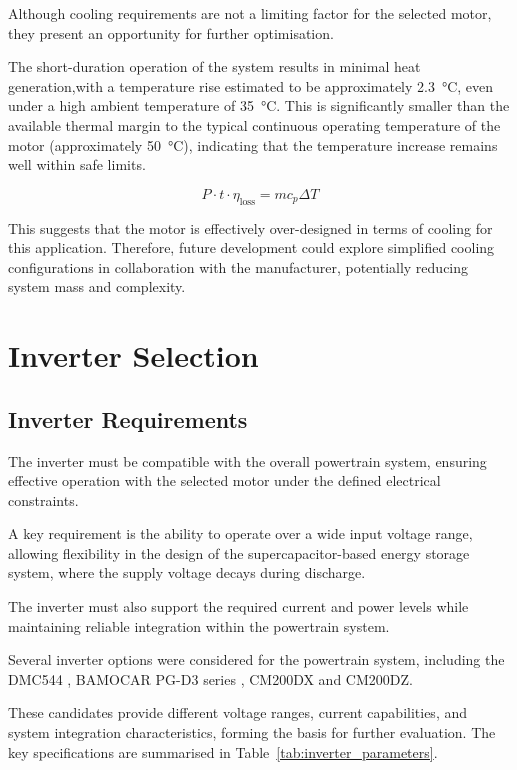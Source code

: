 Although cooling requirements are not a limiting factor for the selected motor, they present an opportunity for further optimisation.

The short-duration operation of the system results in minimal heat generation,with a temperature rise estimated to be approximately \SI{2.3}{\degreeCelsius}, even under a high ambient temperature of \SI{35}{\degreeCelsius}. This is significantly smaller than the available thermal margin to the typical continuous operating temperature of the motor (approximately \SI{50}{\degreeCelsius}), indicating that the temperature increase remains well within safe limits.

\begin{equation}
P \cdot t \cdot \eta_{\text{loss}} = m c_p \Delta T
\end{equation}

This suggests that the motor is effectively over-designed in terms of cooling for this application. Therefore, future development could explore simplified cooling configurations in collaboration with the manufacturer, potentially reducing system mass and complexity.


\section{Inverter Selection}

\subsection{Inverter Requirements}

The inverter must be compatible with the overall powertrain system, ensuring effective operation with the selected motor under the defined electrical constraints.

A key requirement is the ability to operate over a wide input voltage range, allowing flexibility in the design of the supercapacitor-based energy storage system, where the supply voltage decays during discharge.

The inverter must also support the required current and power levels while maintaining reliable integration within the powertrain system.

Several inverter options were considered for the powertrain system, including the DMC544\cite{DMC544_datasheet}
, BAMOCAR PG-D3 series\cite{BAMOCAR_data_sheet}
, CM200DX and CM200DZ\cite{CM200_data_sheet}.

These candidates provide different voltage ranges, current capabilities, and system integration characteristics, forming the basis for further evaluation. The key specifications are summarised in Table~\ref{tab:inverter_parameters}.

